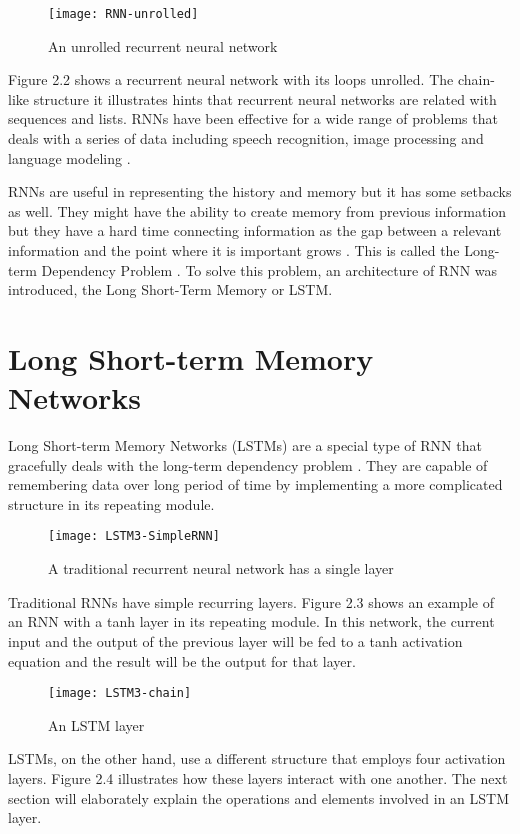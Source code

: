     \begin{figure}[h]
    \centering
    \texttt{[image: RNN-unrolled]}
    \caption{An unrolled recurrent neural network}
    \end{figure}
    Figure 2.2 shows a recurrent neural network with its loops unrolled. The chain-like structure it illustrates hints that recurrent neural networks are related with sequences and lists. RNNs have been effective for a wide range of problems that deals with a series of data including speech recognition, image processing and language modeling \citep{olah2015understanding}.

    RNNs are useful in representing the history and memory but it has some setbacks as well. They might have the ability to create memory from previous information but they have a hard time connecting information as the gap between a relevant information and the point where it is important grows \citep{graves2012supervised}. This is called the Long-term Dependency Problem \citep{bengio1994learning}. To solve this problem, an architecture of RNN was introduced, the Long Short-Term Memory or LSTM.

\section{Long Short-term Memory Networks}
    Long Short-term Memory Networks (LSTMs) are a special type of RNN that gracefully deals with the long-term dependency problem \citep{hochreiter1997long}. They are capable of remembering data over long period of time by implementing a more complicated structure in its repeating module.

    \begin{figure}[h]
    \centering
    \texttt{[image: LSTM3-SimpleRNN]}
    \caption{A traditional recurrent neural network has a single layer}
    \end{figure}
    Traditional RNNs have simple recurring layers. Figure 2.3 shows an example of an RNN with a tanh layer in its repeating module. In this network, the current input and the output of the previous layer will be fed to a tanh activation equation and the result will be the output for that layer.
    
    \begin{figure}[h]
    \centering
    \texttt{[image: LSTM3-chain]}
    \caption{An LSTM layer}
    \end{figure}
    LSTMs, on the other hand, use a different structure that employs four activation layers. Figure 2.4 illustrates how these layers interact with one another. The next section will elaborately explain the operations and elements involved in an LSTM layer.

